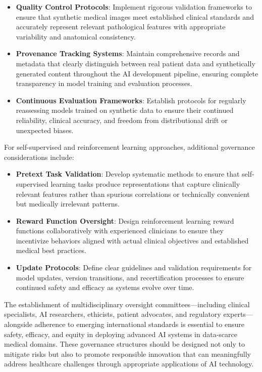 \documentclass{article}
\begin{document}
\begin{itemize}
    \item \textbf{Quality Control Protocols}: Implement rigorous validation frameworks to ensure that synthetic medical images meet established clinical standards and accurately represent relevant pathological features with appropriate variability and anatomical consistency.
    \item \textbf{Provenance Tracking Systems}: Maintain comprehensive records and metadata that clearly distinguish between real patient data and synthetically generated content throughout the AI development pipeline, ensuring complete transparency in model training and evaluation processes.
    \item \textbf{Continuous Evaluation Frameworks}: Establish protocols for regularly reassessing models trained on synthetic data to ensure their continued reliability, clinical accuracy, and freedom from distributional drift or unexpected biases.
\end{itemize}

For self-supervised and reinforcement learning approaches, additional governance considerations include:

\begin{itemize}
    \item \textbf{Pretext Task Validation}: Develop systematic methods to ensure that self-supervised learning tasks produce representations that capture clinically relevant features rather than spurious correlations or technically convenient but medically irrelevant patterns.
    \item \textbf{Reward Function Oversight}: Design reinforcement learning reward functions collaboratively with experienced clinicians to ensure they incentivize behaviors aligned with actual clinical objectives and established medical best practices.
    \item \textbf{Update Protocols}: Define clear guidelines and validation requirements for model updates, version transitions, and recertification processes to ensure continued safety and efficacy as systems evolve over time.
\end{itemize}

The establishment of multidisciplinary oversight committees—including clinical specialists, AI researchers, ethicists, patient advocates, and regulatory experts—alongside adherence to emerging international standards is essential to ensure safety, efficacy, and equity in deploying advanced AI systems in data-scarce medical domains. These governance structures should be designed not only to mitigate risks but also to promote responsible innovation that can meaningfully address healthcare challenges through appropriate applications of AI technology.
\end{document}
